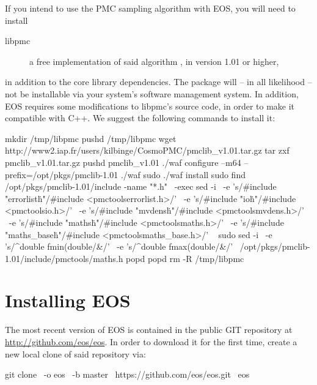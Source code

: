 If you intend to use the \gls{PMC} sampling algorithm with EOS, you will need to install
\begin{description}
    \item[libpmc] a free implementation of said algorithm \cite{libpmc}, in version 1.01 or higher,
\end{description}
in addition to the core library dependencies. The  package will -- in all likelihood -- not
be installable via your system's software management system. In addition, EOS requires some
modifications to libpmc's source code, in order to make it compatible with C++. We suggest
the following commands to install it:
\begin{commandline}
mkdir /tmp/libpmc
pushd /tmp/libpmc
wget http://www2.iap.fr/users/kilbinge/CosmoPMC/pmclib_v1.01.tar.gz
tar zxf pmclib_v1.01.tar.gz
pushd pmclib_v1.01
./waf configure --m64 --prefix=/opt/pkgs/pmclib-1.01
./waf
sudo ./waf install
sudo find /opt/pkgs/pmclib-1.01/include -name "*.h" \
    -exec sed -i \
    -e 's/#include "errorlist\.h"/#include <pmctools\/errorlist.h>/' \
    -e 's/#include "io\.h"/#include <pmctools\/io.h>/' \
    -e 's/#include "mvdens\.h"/#include <pmctools\/mvdens.h>/' \
    -e 's/#include "maths\.h"/#include <pmctools\/maths.h>/' \
    -e 's/#include "maths_base\.h"/#include <pmctools\/maths_base.h>/' \
    {} \;
sudo sed -i \
    -e 's/^double fmin(double/\/\/&/' \
    -e 's/^double fmax(double/\/\/&/' \
    /opt/pkgs/pmclib-1.01/include/pmctools/maths.h
popd
popd
rm -R /tmp/libpmc
\end{commandline}


\section{Installing EOS}

The most recent version of EOS is contained in the public GIT \cite{GIT}
repository at \url{http://github.com/eos/eos}.  In order to download it for the
first time, create a new local clone of said repository via:
%
\begin{commandline}
git clone \
    -o eos \
    -b master \
    https://github.com/eos/eos.git \
    eos
\end{commandline}


